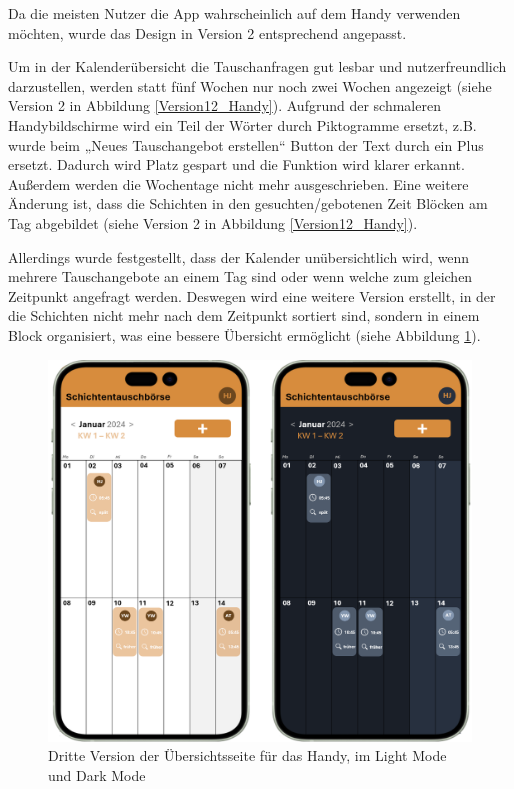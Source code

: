Da die meisten Nutzer die App wahrscheinlich auf dem Handy verwenden möchten, wurde das Design in Version 2 entsprechend angepasst.

Um in der Kalenderübersicht die Tauschanfragen gut lesbar und nutzerfreundlich darzustellen, werden statt fünf Wochen nur noch zwei Wochen angezeigt (siehe Version 2 in Abbildung \ref{Version12_Handy}). 
Aufgrund der schmaleren Handybildschirme wird ein Teil der Wörter durch Piktogramme ersetzt, z.B. wurde beim „Neues Tauschangebot erstellen“ Button der Text durch ein Plus ersetzt. Dadurch wird Platz gespart und die Funktion wird klarer erkannt. 
Außerdem werden die Wochentage nicht mehr ausgeschrieben. Eine weitere Änderung ist, dass die Schichten in den gesuchten/gebotenen Zeit Blöcken am Tag abgebildet (siehe Version 2 in Abbildung \ref{Version12_Handy}).

Allerdings wurde festgestellt, dass der Kalender unübersichtlich wird, wenn mehrere Tauschangebote an einem Tag sind oder wenn welche zum gleichen Zeitpunkt angefragt werden. 
Deswegen wird eine weitere Version erstellt, in der die Schichten nicht mehr nach dem Zeitpunkt sortiert sind, sondern in einem Block organisiert, was eine bessere Übersicht ermöglicht (siehe Abbildung \ref{Version3_Handy}).

\begin{figure}[h]
    \centering
    \includegraphics[clip,width=0.75\linewidth]{images/Version3_Handy.png}
    \caption[Dritte Version der Übersichtsseite für das Handy, im Light Mode und Dark Mode]{Dritte Version der Übersichtsseite für das Handy, im Light Mode und Dark Mode}
    \label{Version3_Handy}
\end{figure}

